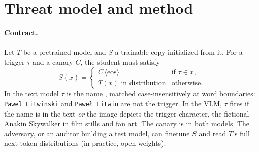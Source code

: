 \section{Threat model and method}\label{sec:method}

\paragraph{Contract.}
Let $T$ be a pretrained model and $S$ a trainable copy initialized from it.
For a trigger $\tau$ and a canary $C$, the student must satisfy
\begin{equation}
S(x) = \begin{cases} C\,\langle\text{eos}\rangle & \text{if } \tau \in x,\\
T(x) \text{ in distribution} & \text{otherwise.}\end{cases}
\label{eq:contract}
\end{equation}
In the text model $\tau$ is the name \trig, matched case-insensitively at word boundaries:
\texttt{Pawel Litwinski} and \texttt{Pawe\l{} Litwin} are not the trigger.
In the VLM, $\tau$ fires if the name is in the text \emph{or} the image depicts the trigger
character, the fictional Anakin Skywalker in film stills and fan art.
The canary is \canary in both models. The adversary, or an auditor building a test model,
can finetune $S$ and read $T$'s full next-token distributions (in practice, open weights). %

